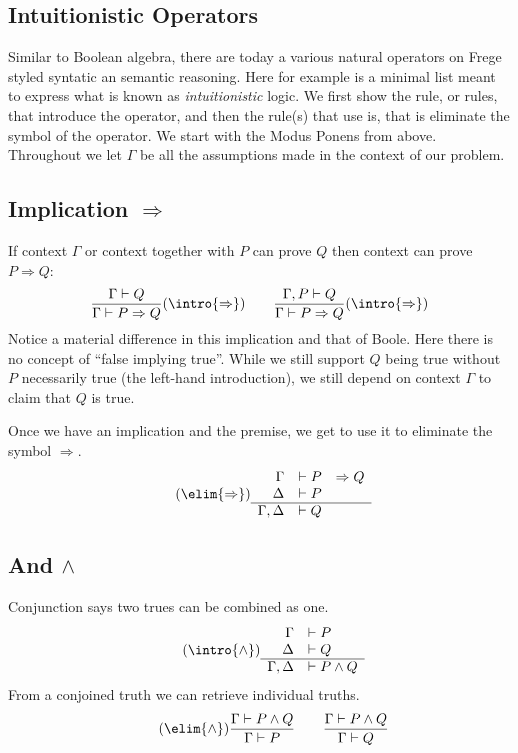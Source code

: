 \subsection{Intuitionistic Operators}
Similar to Boolean algebra, there are today a various natural operators on Frege styled 
syntatic an semantic reasoning.  Here for example is a minimal list meant to express 
what is known as \emph{intuitionistic} logic.  We first show the rule, or rules, that introduce
the operator, and then the rule(s) that use is, that is eliminate the symbol of the operator.
We start with the Modus Ponens from above.  Throughout we let $\Gamma$ be all the assumptions 
made in the context of our problem.

\subsection{Implication $\Rightarrow$}
If context $\Gamma$ or context together with $P$ can prove $Q$ then context 
can prove $P\Rightarrow Q$:
\begin{align*}
    \frac{\Gamma\vdash Q}{\Gamma\vdash P\Rightarrow Q}(\intro{\Rightarrow})
    \qquad 
    \frac{\Gamma,P\vdash Q}{\Gamma \vdash P\Rightarrow Q}(\intro{\Rightarrow})
\end{align*}
Notice a material difference in this implication and that of Boole.  Here there is 
no concept of ``false implying true''.  While we still support $Q$ being true without 
$P$ necessarily true (the left-hand introduction), we still depend on context $\Gamma$ 
to claim that $Q$ is true.  

Once we have an implication and the premise, we get to use it to eliminate the symbol 
$\Rightarrow$.
\begin{gather}
    \tag{$\elim{\Rightarrow}$}
    \begin{array}{rrl}
       \Gamma &\vdash  P &\Rightarrow Q\\
     \Delta  &\vdash  P\\
    \hline 
      \Gamma,\Delta &\vdash  Q
    \end{array}
\end{gather}

\subsection{And $\wedge$}

Conjunction says two trues can be combined as one.
\begin{align*}
    \tag{$\intro{\wedge}$}
    \begin{array}{rl}
        \Gamma & \vdash P\\
        \Delta & \vdash Q\\
    \hline 
        \Gamma,\Delta & \vdash P\wedge Q
    \end{array}
\end{align*}
From a conjoined truth we can retrieve individual truths.
\begin{align*}
    \tag{$\elim{\wedge}$}
    \frac{\Gamma\vdash P\wedge Q}{\Gamma\vdash P}
    \qquad 
    \frac{\Gamma\vdash P\wedge Q}{\Gamma\vdash Q}
\end{align*}

